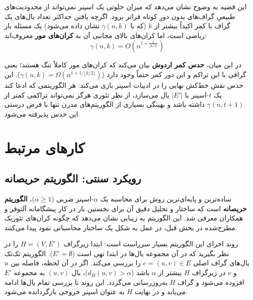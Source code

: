 \documentclass[11pt,a4paper]{report}
\theoremstyle{plain}
\theoremstyle{definition}
\theoremstyle{remark}
\begin{document}
این قضیه به وضوح نشان می‌دهد که میزان خلوتی یک اسپنر نمی‌تواند از محدودیت‌های طبیعیِ گراف‌های بدون دورِ کوتاه فراتر برود. اگرچه یافتن حداکثر تعداد یال‌های یک گراف با کمر اکیداً بیشتر از $k$ (که با $\gamma(n,k)$ نشان داده می‌شود) یک مسئله باز ریاضی است، اما کران‌های بالای مجانبی آن به \textbf{کران‌های مور} معروف‌اند:
\[ \gamma(n,k) = O\left(n^{1 + \frac{1}{\lfloor k/2 \rfloor}}\right) \]

در این میان، \textbf{حدس کمر اردوش} بیان می‌کند که کران‌های مور کاملاً تنگ هستند؛ یعنی گرافی با این تراکم و این دور کمر حتماً وجود دارد ($\gamma(n,k) = \Omega(n^{1 + 1/\lfloor k/2 \rfloor})$). این حدس نقش خط‌کش نهایی را در ادبیات اسپنر بازی می‌کند: هر الگوریتمی که ادعا کند یک $t$-اسپنر با $|E'|$ یال می‌سازد، از نظر تئوری هرگز نمی‌تواند تراکمی کمتر از $\gamma(n, t+1)$ داشته باشد و بهینگی بسیاری از الگوریتم‌های مدرن تنها با فرض درستی این حدس پذیرفته می‌شود.
\section{کارهای مرتبط}

\subsection{رویکرد سنتی: الگوریتم حریصانه}
ساده‌ترین و پایه‌ای‌ترین روش برای محاسبه یک $\alpha$-اسپنر ضربی ($\alpha \ge 1$)، \textbf{الگوریتم حریصانه} است که ساختار و تحلیل دقیق آن برای نخستین بار در کار پیشگامانه آلتوفر و همکاران \cite{althofer1993sparse} معرفی شد. این الگوریتم به زیبایی نشان می‌دهد که چگونه کران‌های تئوریک مطرح‌شده در بخش قبل، در عمل به شکل یک ساختار محاسباتی نمود پیدا می‌کنند. 

روند اجرای این الگوریتم بسیار سرراست است: ابتدا زیرگراف $H = (V, E')$ را در نظر بگیرید که در آن مجموعه یال‌ها در ابتدا تهی است ($E' = \emptyset$). الگوریتم تک‌تک یال‌های گراف اصلی $e = (u,v) \in E$ را بررسی می‌کند. اگر در آن لحظه، فاصله بین $u$ و $v$ در زیرگراف $H$ بیشتر از $\alpha$ باشد ($d_H(u,v) > \alpha$)، یال $(u,v)$ به مجموعه $E'$ افزوده می‌شود و گراف $H$ به‌روزرسانی می‌گردد. این روند تا بررسی تمام یال‌ها ادامه می‌یابد و در نهایت $H$ به عنوان اسپنر خروجی بازگردانده می‌شود.
\end{document}
